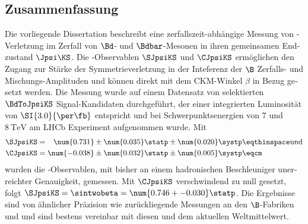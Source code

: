\vspace{5ex}
\begin{german}
\section*{Zusammenfassung}
Die vorliegende Dissertation beschreibt eine zerfallszeit-abhängige Messung von
\CP-Verletzung im Zerfall von $\Bd$- und $\Bdbar$-Mesonen in ihren gemeinsamen
Endzustand $\Jpsi\KS$. Die \CP-Observablen $\SJpsiKS$ und $\CJpsiKS$ ermöglichen
den Zugang zur Stärke der Symmetrieverletzung in der Inteferenz der $\B$
Zerfalls- und Mischungs-Amplituden und können direkt mit dem \acs{CKM}-Winkel
$\beta$ in Bezug gesetzt werden. Die Messung wurde auf einem Datensatz von
selektierten $\BdToJpsiKS$ Signal-Kandidaten durchgeführt, der einer
integrierten Luminosität von $\SI{3.0}{\per\fb}$ entspricht und bei
Schwerpunktsenergien von $\num{7}$ und $\SI{8}{\TeV}$ am \acs{LHCb} Experiment
aufgenommen wurde. Mit
%
\begin{equation*}
  \begin{split}
    \SJpsiKS &= \phantom{-}\num{0.731} \pm \num{0.035} \statp \pm \num{0.020} \systp \eqthinspace\text{und} \\
    \CJpsiKS &=           \num{-0.038} \pm \num{0.032} \statp \pm \num{0.005} \systp \eqcm
  \end{split}
\end{equation*}
%
wurden die \CP-Observablen, mit bisher an einem hadronischen Beschleuniger
unerreichter Genauigkeit, gemessen. Mit $\CJpsiKS$ verschwindend zu null
gesetzt, folgt $\SJpsiKS = \sintwobeta = \num{0.746 +- 0.030}\statp$. Die
Ergebnisse sind von ähnlicher Präzision wie zurückliegende Messungen an den
$\B$-Fabriken \Babar und \Belle und sind bestens vereinbar mit diesen und dem
aktuellen Weltmittelwert.
\end{german}

\setcounter{page}{1}

